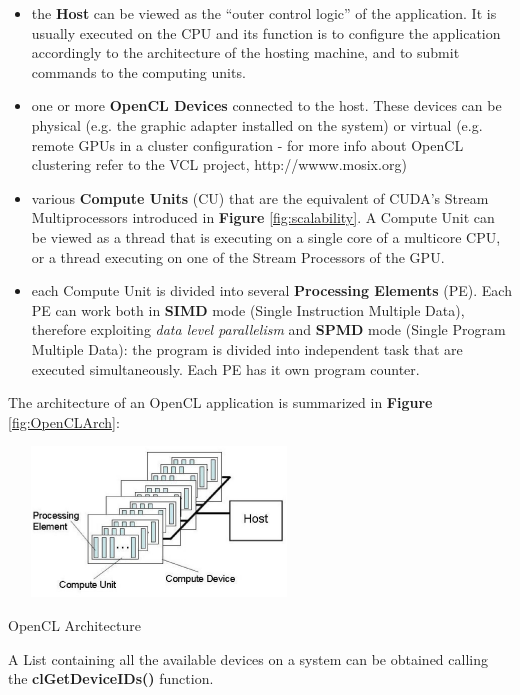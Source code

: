 \begin{itemize}
	\item the \textbf{Host} can be viewed as the "`outer control logic"' of the application. It is usually executed on the CPU and its function is to configure the application accordingly to the architecture of the hosting machine, and to submit commands to the computing units.
	\item one or more \textbf{OpenCL Devices} connected to the host. These devices can be physical (e.g. the graphic adapter installed on the system) or virtual (e.g. remote GPUs in a cluster configuration - for more info about OpenCL clustering refer to the VCL project, http://wwww.mosix.org)
	\item various \textbf{Compute Units} (CU) that are the equivalent of CUDA's Stream Multiprocessors introduced in \textbf{Figure} \ref{fig:scalability}. A Compute Unit can be viewed as a thread that is executing on a single core of a multicore CPU, or a thread executing on one of the Stream Processors of the GPU.
	\item each Compute Unit is divided into several \textbf{Processing Elements} (PE). Each PE can work both in \textbf{SIMD} mode (Single Instruction Multiple Data), therefore exploiting \textit{data level parallelism} and \textbf{SPMD} mode (Single Program Multiple Data): the program is divided into independent task that are executed simultaneously.
	Each PE has it own program counter.
\end{itemize}

The architecture of an OpenCL application is summarized in \textbf{Figure} \ref{fig:OpenCLArch}:

\begin{figurehere}
 \centering
 \includegraphics[width=8cm, height=4cm]{./eps/OpenCLArch.eps}
 \caption{OpenCL Architecture}
 \label{fig:OpenCLArch}
\end{figurehere}

\begin{CLCode}
A List containing all the available devices on a system can be obtained calling the \textbf{clGetDeviceIDs()} function. 
\end{CLCode}


